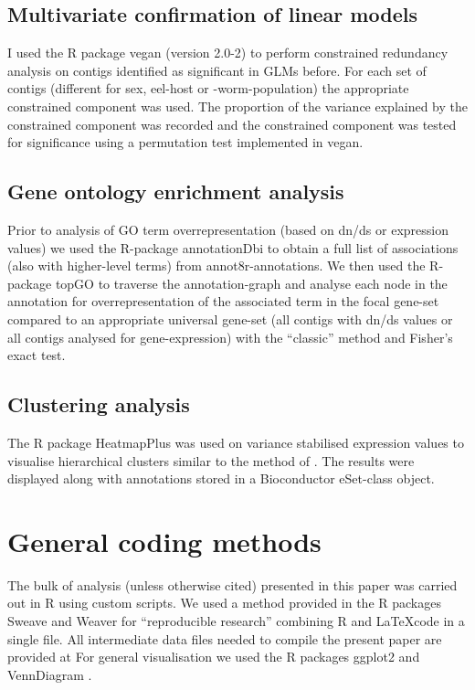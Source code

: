 \documentclass[10pt]{article}
\begin{document}
\subsection{Multivariate confirmation of linear models}

I used the R package vegan (version 2.0-2) to perform constrained
redundancy analysis on contigs identified as significant in GLMs
before. For each set of contigs (different for sex, eel-host or
-worm-population) the appropriate constrained component was used. The
proportion of the variance explained by the constrained component was
recorded and the constrained component was tested for significance
using a permutation test implemented in vegan.

\subsection{Gene ontology enrichment analysis}

Prior to analysis of GO term overrepresentation (based on dn/ds or
expression values) we used the R-package annotationDbi
\cite{AnnotationDbi} to obtain a full list of associations (also with
higher-level terms) from annot8r-annotations. We then used the
R-package topGO \cite{topGO} to traverse the annotation-graph and
analyse each node in the annotation for overrepresentation of the
associated term in the focal gene-set compared to an appropriate
universal gene-set (all contigs with dn/ds values or all contigs
analysed for gene-expression) with the ``classic'' method and Fisher's
exact test.

\subsection{Clustering analysis}

The R package HeatmapPlus was used on variance stabilised expression
values to visualise hierarchical clusters similar to the method of
\cite{pmid9843981}. The results were displayed along with annotations
stored in a Bioconductor eSet-class object.

\section{General coding methods}

The bulk of analysis (unless otherwise cited) presented in this paper
was carried out in R \cite{R_project} using custom scripts. We used a
method provided in the R packages Sweave
\cite{lmucs-papers:Leisch:2002} and Weaver \cite{weaver} for
``reproducible research'' combining R and \LaTeX code in a single
file. All intermediate data files needed to compile the present paper
are provided at For general visualisation we used the R packages
ggplot2 \cite{ggplot-book} and VennDiagram \cite{pmid21269502}.
\end{document}
